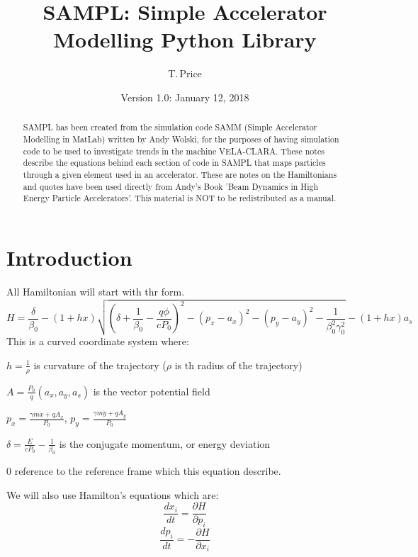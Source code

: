 \documentclass[11pt,a4paper]{article}
\begin{document}
	
	\title{SAMPL: Simple Accelerator Modelling Python Library}
	\author{T.\,Price}
	\date{Version 1.0: January 12, 2018}
	
	\maketitle
	
	\begin{abstract}
	SAMPL has been created from the simulation code SAMM (Simple Accelerator Modelling in MatLab) written by Andy Wolski, for the purposes of having simulation code to be used to investigate trends in the machine VELA-CLARA. These notes describe the equations behind each section of code in SAMPL that maps particles through a given element used in an accelerator. These are notes on the Hamiltonians and quotes have been used directly from Andy's Book 'Beam Dynamics in High Energy Particle Accelerators'. This material is NOT to be redistributed as a manual.
	\end{abstract}
	
	\newpage
	
	\tableofcontents
	
	\newpage
	\section{Introduction}
	All Hamiltonian will start with thr form.
	\[
	H=\frac{\delta}{\beta_0}-(1+hx)\sqrt{(\delta+\frac{1}{\beta_0}-\frac{q\phi}{cP_0})^2-(p_x-a_x)^2-(p_y-a_y)^2-\frac{1}{\beta_0^2\gamma_0^2}}-(1+hx)a_s
	\]
	This is a curved coordinate system where:
	
	$h=\frac{1}{\rho}$ is curvature of the trajectory ($\rho$ is th radius of the trajectory)
	
	$A=\frac{P_0}{q}(a_x,a_y,a_s)$ is the vector potential field
	
	$p_x=\frac{\gamma m\dot{x}+qA_x}{P_0}$, $p_y=\frac{\gamma m\dot{y}+qA_y}{P_0}$
	
	$\delta =  \frac{E}{cP_0}-\frac{1}{\beta_0}$ is the conjugate momentum, or energy deviation
	
	$0$ reference to the reference frame which this equation describe.
	
	We will also use Hamilton's equations which are:
	\[
	\frac{dx_i}{dt}=\frac{\partial H}{\partial p_i}
	\]	
	\[
	\frac{dp_i}{dt}=-\frac{\partial H}{\partial x_i}
	\]
\end{document}
